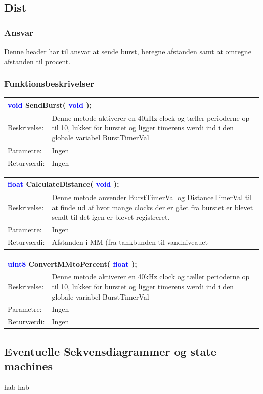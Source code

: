 \subsection{Dist}
\subsubsection{Ansvar}
Denne header har til ansvar at sende burst, beregne afstanden samt at omregne afstanden til procent.
\subsubsection{Funktionsbeskrivelser}

\begin{table}[H]
\begin{tabular}{l p{12.5cm}}
\multicolumn{2}{l}{\textcolor{blue}{void} SendBurst( \textcolor{blue}{void} );} \\
\hline
Beskrivelse:&Denne metode aktiverer en 40kHz clock og tæller perioderne op til 10, lukker for burstet og ligger timerens værdi ind i den globale variabel BurstTimerVal\\
Parametre:&Ingen\\
Returværdi:&Ingen\\
\end{tabular}
\end{table}

\begin{table}[H]
\begin{tabular}{l p{12.5cm}}
\multicolumn{2}{l}{\textcolor{blue}{float} CalculateDistance( \textcolor{blue}{void} );} \\
\hline
Beskrivelse:&Denne metode anvender BurstTimerVal og DistanceTimerVal til at finde ud af hvor mange clocks der er gået fra burstet er blevet sendt til det igen er blevet registreret.\\
Parametre:&Ingen\\
Returværdi:&Afstanden i MM (fra tankbunden til vandniveauet\\
\end{tabular}
\end{table}

\begin{table}[H]
\begin{tabular}{l p{12.5cm}}
\multicolumn{2}{l}{\textcolor{blue}{uint8} ConvertMMtoPercent( \textcolor{blue}{float} );} \\
\hline
Beskrivelse:&Denne metode aktiverer en 40kHz clock og tæller perioderne op til 10, lukker for burstet og ligger timerens værdi ind i den globale variabel BurstTimerVal\\
Parametre:&Ingen\\
Returværdi:&Ingen\\
\end{tabular}
\end{table}
\subsection{Eventuelle Sekvensdiagrammer og state machines}
hab hab
